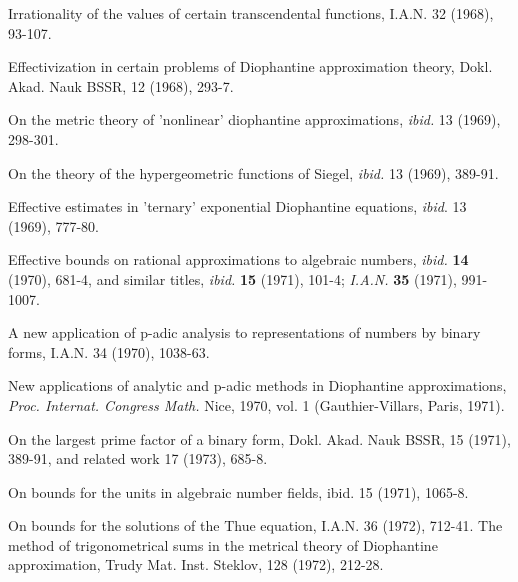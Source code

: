 \begin{hanglist}
    \item \hspace{1.5em} Irrationality of the values of certain transcendental functions, I.A.N. 32 (1968), 93-107.
    \item \hspace{1.5em} Effectivization in certain problems of Diophantine approximation theory, Dokl. Akad. Nauk BSSR, 12 (1968), 293-7.
    \item \hspace{1.5em} On the metric theory of 'nonlinear' diophantine approximations, \textit{ibid.} 13 (1969), 298-301.
    \item \hspace{1.5em} On the theory of the hypergeometric functions of Siegel, \textit{ibid.} 13 (1969), 389-91.
    \item \hspace{1.5em} Effective estimates in 'ternary' exponential Diophantine equations, \textit{ibid}. 13 (1969), 777-80.
    \item \hspace{1.5em} Effective bounds on rational approximations to algebraic numbers, \textit{ibid.} \textbf{14} (1970), 681-4, and similar titles, \textit{ibid.} \textbf{15} (1971), 101-4; \textit{I.A.N.} \textbf{35} (1971), 991-1007.
    \item \hspace{1.5em} A new application of p-adic analysis to representations of numbers by binary forms, I.A.N. 34 (1970), 1038-63.
    \item \hspace{1.5em} New applications of analytic and p-adic methods in Diophantine approximations, \textit{Proc. Internat. Congress Math.} Nice, 1970, vol. 1 (Gauthier-Villars, Paris, 1971).
    \item \hspace{1.5em} On the largest prime factor of a binary form, Dokl. Akad. Nauk BSSR, 15 (1971), 389-91, and related work 17 (1973), 685-8.
    \item \hspace{1.5em} On bounds for the units in algebraic number fields, ibid. 15 (1971), 1065-8.
    \item On bounds for the solutions of the Thue equation, I.A.N. 36 (1972), 712-41. The method of trigonometrical sums in the metrical theory of Diophantine approximation, Trudy Mat. Inst. Steklov, 128 (1972), 212-28.

\end{hanglist}
